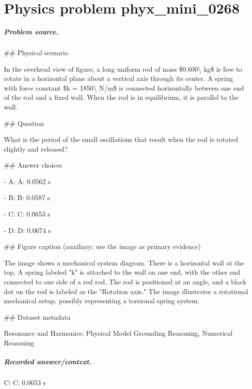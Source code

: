 
\chapter{Physics problem phyx\_mini\_0268}
\label{ch:PhyXMiniProblems_problem_phyx_mini_0268}

\paragraph{Problem source.}
\#\# Physical scenario

In the overhead view of figure, a long uniform rod of mass \$0.600\textbackslash{} kg\$ is free to rotate in a horizontal plane about a vertical axis through its center. A spring with force constant \$k = 1850\textbackslash{} N/m\$ is connected horizontally between one end of the rod and a fixed wall. When the rod is in equilibrium, it is parallel to the wall.

\#\# Question

What is the period of the small oscillations that result when the rod is rotated slightly and released?

\#\# Answer choices

- A: A: 0.0562 s

- B: B: 0.0587 s

- C: C: 0.0653 s

- D: D: 0.0674 s

\#\# Figure caption (auxiliary; use the image as primary evidence)

The image shows a mechanical system diagram. There is a horizontal wall at the top. A spring labeled "k" is attached to the wall on one end, with the other end connected to one side of a red rod. The rod is positioned at an angle, and a black dot on the rod is labeled as the "Rotation axis." The image illustrates a rotational mechanical setup, possibly representing a torsional spring system.

\#\# Dataset metadata

Resonance and Harmonics; Physical Model Grounding Reasoning, Numerical Reasoning

\paragraph{Recorded answer/context.}
C: C: 0.0653 s

